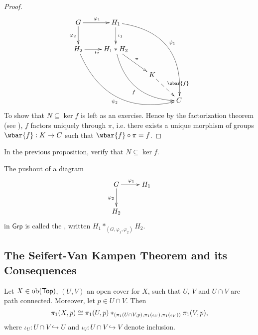 \begin{proof}
\begin{equation*}
		\xymatrix{
			G \ar[r]^{\varphi_1}\ar[d]_{\varphi_2} & H_1 \ar[d]^{\iota_1}\ar@/^3pc/[dddrr]^{\psi_1}\\
			H_2 \ar[r]_{\iota_2} \ar@/_3pc/[ddrrr]_{\psi_2} & H_1 \ast H_2 \ar[dr]^\pi\ar@/_2pc/[ddrr]_f\\
			& & K \ar@{-->}[dr]^{\wbar{f}}\\
			& & & C
		}
	\end{equation*}
	To show that $N \subseteq \ker f$ is left as an exercise. Hence by the factorization theorem (see \cite[23]{grillet:abstract_algebra:2007}), $f$ factors uniquely through $\pi$, i.e. there exists a unique morphism of groups $\wbar{f} : K \to C$ such that $\wbar{f} \circ \pi = f$.
\end{proof}

\begin{exercise}
	In the previous proposition, verify that $N \subseteq \ker f$.
\end{exercise}

\begin{definition}
	The pushout of a diagram
		\begin{equation*}
		\xymatrix{
			G \ar[r]^{\varphi_1}\ar[d]_{\varphi_2} & H_1\\
			H_2
		}
	\end{equation*}
	\noindent in $\mathsf{Grp}$ is called the , written $H_1 \ast_{(G,\varphi_1,\varphi_2)} H_2$.
\end{definition}

\subsection*{The Seifert-Van Kampen Theorem and its Consequences}

\begin{theorem}
	Let $X \in \operatorname{ob}(\mathsf{Top})$, $(U,V)$ an open cover for $X$, such that $U$, $V$ and $U \cap V$ are path connected. Moreover, let $p \in U \cap V$. Then
	\begin{equation}
		\pi_1(X,p) \cong \pi_1(U,p) \ast_{\del[0]{\pi_1(U \cap V,p),\pi_1(\iota_U),\pi_1(\iota_V)}} \pi_1(V,p),
	\end{equation}
	\noindent where $\iota_U : U \cap V \hookrightarrow U$ and $\iota_V : U \cap V \hookrightarrow V$ denote inclusion.
	\label{thm:seifert-van_kampen}
\end{theorem}

